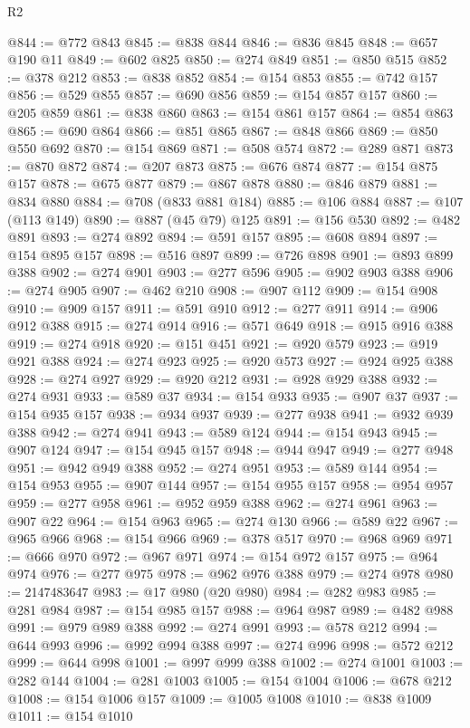 \begin{lexlean}{R2}
\begin{coremodule}
@844 := @772 @843
@845 := @838 @844
@846 := @836 @845
@848 := @657 @190 @11
@849 := @602 @825
@850 := @274 @849
@851 := @850 @515
@852 := @378 @212
@853 := @838 @852
@854 := @154 @853
@855 := @742 @157
@856 := @529 @855
@857 := @690 @856
@859 := @154 @857 @157
@860 := @205 @859
@861 := @838 @860
@863 := @154 @861 @157
@864 := @854 @863
@865 := @690 @864
@866 := @851 @865
@867 := @848 @866
@869 := @850 @550 @692
@870 := @154 @869
@871 := @508 @574
@872 := @289 @871
@873 := @870 @872
@874 := @207 @873
@875 := @676 @874
@877 := @154 @875 @157
@878 := @675 @877
@879 := @867 @878
@880 := @846 @879
@881 := @834 @880
@884 := @708 (@833 @881 @184)
@885 := @106 @884
@887 := @107 (@113 @149)
@890 := @887 (@45 @79) @125
@891 := @156 @530
@892 := @482 @891
@893 := @274 @892
@894 := @591 @157
@895 := @608 @894
@897 := @154 @895 @157
@898 := @516 @897
@899 := @726 @898
@901 := @893 @899 @388
@902 := @274 @901
@903 := @277 @596
@905 := @902 @903 @388
@906 := @274 @905
@907 := @462 @210
@908 := @907 @112
@909 := @154 @908
@910 := @909 @157
@911 := @591 @910
@912 := @277 @911
@914 := @906 @912 @388
@915 := @274 @914
@916 := @571 @649
@918 := @915 @916 @388
@919 := @274 @918
@920 := @151 @451
@921 := @920 @579
@923 := @919 @921 @388
@924 := @274 @923
@925 := @920 @573
@927 := @924 @925 @388
@928 := @274 @927
@929 := @920 @212
@931 := @928 @929 @388
@932 := @274 @931
@933 := @589 @37
@934 := @154 @933
@935 := @907 @37
@937 := @154 @935 @157
@938 := @934 @937
@939 := @277 @938
@941 := @932 @939 @388
@942 := @274 @941
@943 := @589 @124
@944 := @154 @943
@945 := @907 @124
@947 := @154 @945 @157
@948 := @944 @947
@949 := @277 @948
@951 := @942 @949 @388
@952 := @274 @951
@953 := @589 @144
@954 := @154 @953
@955 := @907 @144
@957 := @154 @955 @157
@958 := @954 @957
@959 := @277 @958
@961 := @952 @959 @388
@962 := @274 @961
@963 := @907 @22
@964 := @154 @963
@965 := @274 @130
@966 := @589 @22
@967 := @965 @966
@968 := @154 @966
@969 := @378 @517
@970 := @968 @969
@971 := @666 @970
@972 := @967 @971
@974 := @154 @972 @157
@975 := @964 @974
@976 := @277 @975
@978 := @962 @976 @388
@979 := @274 @978
@980 := 2147483647
@983 := @17 @980 (@20 @980)
@984 := @282 @983
@985 := @281 @984
@987 := @154 @985 @157
@988 := @964 @987
@989 := @482 @988
@991 := @979 @989 @388
@992 := @274 @991
@993 := @578 @212
@994 := @644 @993
@996 := @992 @994 @388
@997 := @274 @996
@998 := @572 @212
@999 := @644 @998
@1001 := @997 @999 @388
@1002 := @274 @1001
@1003 := @282 @144
@1004 := @281 @1003
@1005 := @154 @1004
@1006 := @678 @212
@1008 := @154 @1006 @157
@1009 := @1005 @1008
@1010 := @838 @1009
@1011 := @154 @1010

\end{coremodule}
\end{lexlean}
